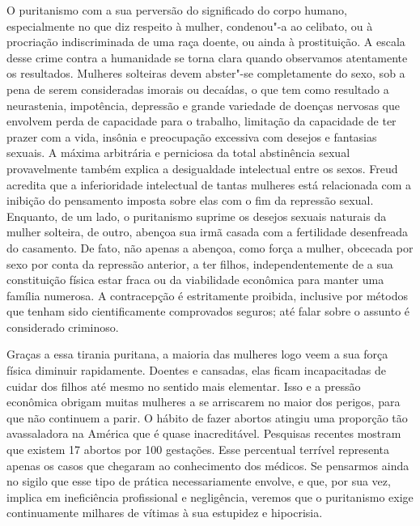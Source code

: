 O puritanismo com a sua perversão do significado do corpo humano,
especialmente no que diz respeito à mulher, condenou"-a ao celibato, ou à
procriação indiscriminada de uma raça doente, ou ainda à prostituição. A
escala desse crime contra a humanidade se torna clara quando observamos
atentamente os resultados. Mulheres solteiras devem abster"-se
completamente do sexo, sob a pena de serem consideradas imorais ou
decaídas, o que tem como resultado a neurastenia, impotência, depressão
e grande variedade de doenças nervosas que envolvem perda de capacidade
para o trabalho, limitação da capacidade de ter prazer com a vida,
insônia e preocupação excessiva com desejos e fantasias sexuais. A
máxima arbitrária e perniciosa da total abstinência sexual provavelmente
também explica a desigualdade intelectual entre os sexos. Freud acredita
que a inferioridade intelectual de tantas mulheres está relacionada com
a inibição do pensamento imposta sobre elas com o fim da repressão
sexual. Enquanto, de um lado, o puritanismo suprime os desejos sexuais
naturais da mulher solteira, de outro, abençoa sua irmã casada com a
fertilidade desenfreada do casamento. De fato, não apenas a abençoa,
como força a mulher, obcecada por sexo por conta da repressão anterior,
a ter filhos, independentemente de a sua constituição física estar fraca
ou da viabilidade econômica para manter uma família numerosa. A
contracepção é estritamente proibida, inclusive por métodos que tenham
sido cientificamente comprovados seguros; até falar sobre o assunto é
considerado criminoso.

Graças a essa tirania puritana, a maioria das mulheres logo veem a sua
força física diminuir rapidamente. Doentes e cansadas, elas ficam
incapacitadas de cuidar dos filhos até mesmo no sentido mais elementar.
Isso e a pressão econômica obrigam muitas mulheres a se arriscarem no
maior dos perigos, para que não continuem a parir. O hábito de fazer
abortos atingiu uma proporção tão avassaladora na América que é quase
inacreditável. Pesquisas recentes mostram que existem 17 abortos por 100
gestações. Esse percentual terrível representa apenas os casos que
chegaram ao conhecimento dos médicos. Se pensarmos ainda no sigilo que
esse tipo de prática necessariamente envolve, e que, por sua vez, implica em %
ineficiência profissional e negligência, veremos que o puritanismo exige continuamente
milhares de vítimas à sua estupidez e hipocrisia.

